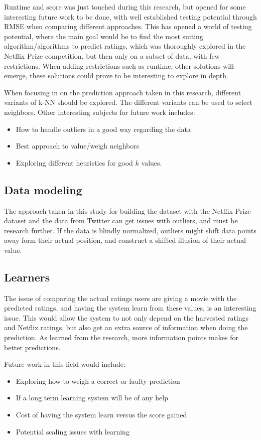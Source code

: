 Runtime and score was just touched during this research, but opened for some interesting future work to be done, with well established testing potential through RMSE when comparing different approaches. This has opened a world of testing potential, where the main goal would be to find the most suiting algorithm/algorithms to predict ratings, which was thoroughly explored in the Netflix Prize competition, but then only on a subset of data, with few restrictions. When adding restrictions such as runtime, other solutions will emerge, these solutions could prove to be interesting to explore in depth.

When focusing in on the prediction approach taken in this research, different variants of k-NN should be explored. The different variants can be used to select neighbors. Other interesting subjects for future work includes:

\begin{itemize}
    \item How to handle outliers in a good way regarding the data
    \item Best approach to value/weigh neighbors
    \item Exploring different heuristics for good $k$ values.
\end{itemize}



\subsection{Data modeling}
The approach taken in this study for building the dataset with the Netflix Prize dataset and the data from Twitter can get issues with outliers, and must be research further. If the data is blindly normalized, outliers might shift data points away form their actual position, and construct a shifted illusion of their actual value.


\subsection{Learners}
The issue of comparing the actual ratings users are giving a movie with the predicted ratings, and having the system learn from these values, is an interesting issue. This would allow the system to not only depend on the harvested ratings and Netflix ratings, but also get an extra source of information when doing the prediction. As learned from the research, more information points makes for better predictions.

Future work in this field would include:
\begin{itemize}
    \item Exploring how to weigh a correct or faulty prediction
    \item If a long term learning system will be of any help
    \item Cost of having the system learn versus the score gained
    \item Potential scaling issues with learning
\end{itemize}


